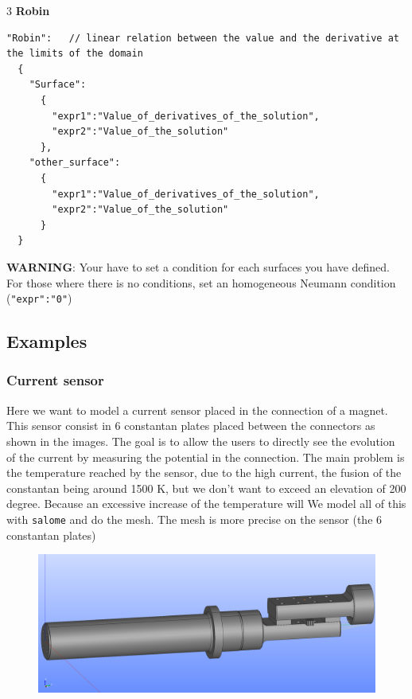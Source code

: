 \documentclass[11pt]{amsart}
\newcommand{\admonition}[2]{\textbf{#1}: {#2}}
\begin{document}
3 \textbf{Robin}


\begin{verbatim}
"Robin":   // linear relation between the value and the derivative at the limits of the domain
  {
    "Surface":
      {
        "expr1":"Value_of_derivatives_of_the_solution",
        "expr2":"Value_of_the_solution"
      },
    "other_surface":
      {
        "expr1":"Value_of_derivatives_of_the_solution",
        "expr2":"Value_of_the_solution"
      }
  }
\end{verbatim}

\admonition{WARNING}{Your have to set a condition for each surfaces you have defined.
For those where there is no conditions, set an homogeneous Neumann condition (\texttt{"expr":"0"})}
\hypertarget{x-examples}{\subsection{Examples}}
\hypertarget{x-current-sensor}{\subsubsection{Current sensor}}
Here we want to model a current sensor placed in the connection of a magnet.
This sensor consist in 6 constantan plates placed between the connectors as shown in the images.
The goal is to allow the users to directly see the evolution of the current by measuring the potential in the connection.
The main problem is the temperature reached by the sensor, due to the high current, the fusion of the constantan being around 1500 K, but we don’t want to exceed an elevation of 200 degree.
Because an excessive increase of the temperature will
We model all of this with \texttt{salome} and do the mesh.
The mesh is more precise on the sensor (the 6 constantan plates)


\begin{figure}
\centering\includegraphics[width=4.75truein]{./images/learning/thermoelectric/Ensemble_CapteurCourant.png}


\end{figure}
\end{document}
